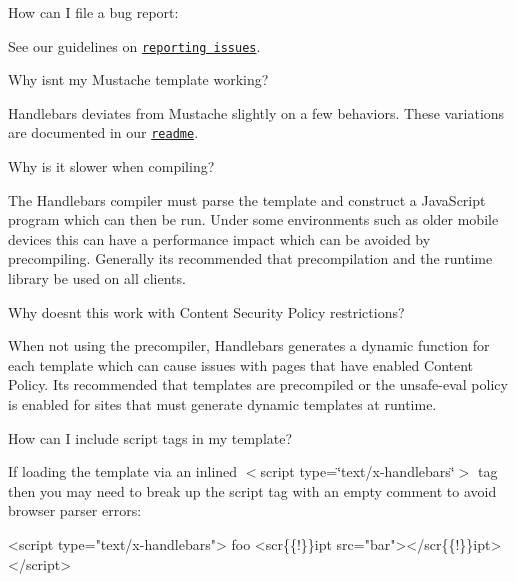 
\begin{DoxyEnumerate}
\item How can I file a bug report\+:

See our guidelines on \href{https://github.com/wycats/handlebars.js/blob/master/CONTRIBUTING.md#reporting-issues}{\tt reporting issues}.
\end{DoxyEnumerate}
\begin{DoxyEnumerate}
\item Why isn\textquotesingle{}t my Mustache template working?

Handlebars deviates from Mustache slightly on a few behaviors. These variations are documented in our \href{https://github.com/wycats/handlebars.js#differences-between-handlebarsjs-and-mustache}{\tt readme}.
\end{DoxyEnumerate}
\begin{DoxyEnumerate}
\item Why is it slower when compiling?

The Handlebars compiler must parse the template and construct a Java\+Script program which can then be run. Under some environments such as older mobile devices this can have a performance impact which can be avoided by precompiling. Generally it\textquotesingle{}s recommended that precompilation and the runtime library be used on all clients.
\end{DoxyEnumerate}
\begin{DoxyEnumerate}
\item Why doesn\textquotesingle{}t this work with Content Security Policy restrictions?

When not using the precompiler, Handlebars generates a dynamic function for each template which can cause issues with pages that have enabled Content Policy. It\textquotesingle{}s recommended that templates are precompiled or the {\ttfamily unsafe-\/eval} policy is enabled for sites that must generate dynamic templates at runtime.
\end{DoxyEnumerate}
\begin{DoxyEnumerate}
\item How can I include script tags in my template?

If loading the template via an inlined {\ttfamily $<$script type=\char`\"{}text/x-\/handlebars\char`\"{}$>$} tag then you may need to break up the script tag with an empty comment to avoid browser parser errors\+:
\end{DoxyEnumerate}


\begin{DoxyCode}
<script type="text/x-handlebars">
  foo
  <scr\{\{!\}\}ipt src="bar"></scr\{\{!\}\}ipt>
</script>
\end{DoxyCode}



